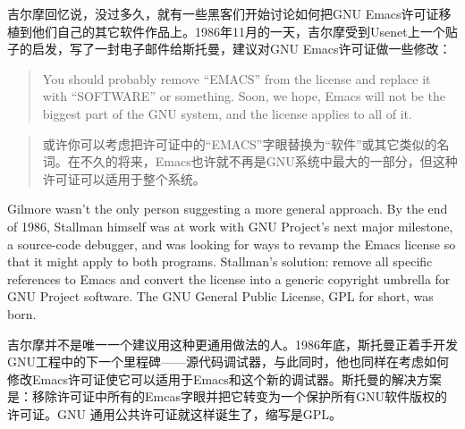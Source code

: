 \ifdefined\chs
吉尔摩回忆说，没过多久，就有一些黑客们开始讨论如何把GNU Emacs许可证移植到他们自己的其它软件作品上。1986年11月的一天，吉尔摩受到Usenet上一个贴子的启发，写了一封电子邮件给斯托曼，建议对GNU Emacs许可证做一些修改：
\fi

\ifdefined\eng
\begin{quote}
You should probably remove ``EMACS'' from the license and replace it with ``SOFTWARE'' or something. Soon, we hope, Emacs will not be the biggest part of the GNU system, and the license applies to all of it.
\end{quote}
\fi

\ifdefined\chs
\begin{quote}
或许你可以考虑把许可证中的``EMACS''字眼替换为``软件''或其它类似的名词。在不久的将来，Emacs也许就不再是GNU系统中最大的一部分，但这种许可证可以适用于整个系统。 
\end{quote}
\fi

\ifdefined\eng
Gilmore wasn't the only person suggesting a more general approach. By the end of 1986, Stallman himself was at work with GNU Project's next major milestone, a source-code debugger, and was looking for ways to revamp the Emacs license so that it might apply to both programs. Stallman's solution: remove all specific references to Emacs and convert the license into a generic copyright umbrella for GNU Project software. The GNU General Public License, GPL for short, was born.
\fi

\ifdefined\chs
吉尔摩并不是唯一一个建议用这种更通用做法的人。1986年底，斯托曼正着手开发GNU工程中的下一个里程碑——源代码调试器，与此同时，他也同样在考虑如何修改Emacs许可证使它可以适用于Emacs和这个新的调试器。斯托曼的解决方案是：移除许可证中所有的Emcas字眼并把它转变为一个保护所有GNU软件版权的许可证。GNU 通用公共许可证就这样诞生了，缩写是GPL。
\fi

